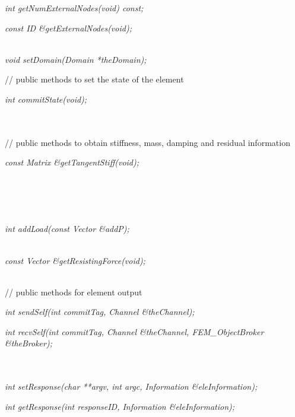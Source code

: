 {\em    int getNumExternalNodes(void) const;} 

{\em    const ID \&getExternalNodes(void);} 

 \\	
{\em    void setDomain(Domain *theDomain);} 


   // public methods to set the state of the element    

{\em    int commitState(void);} 

 \\        
 \\        

   // public methods to obtain stiffness, mass, damping and residual information    

{\em    const Matrix \&getTangentStiff(void);} 

 \\    
 \\    
 \\    

 \\	
{\em    int addLoad(const Vector \&addP);} 

 \\    
{\em    const Vector \&getResistingForce(void);} 

 \\            

   // public methods for element output 

{\em    int sendSelf(int commitTag, Channel \&theChannel);} 

{\em    int recvSelf(int commitTag, Channel \&theChannel, FEM\_ObjectBroker \&theBroker);} 

 \\    
 \\    

{\em    int setResponse(char **argv, int argc, Information \&eleInformation);} 

{\em    int getResponse(int responseID, Information \&eleInformation);} 

